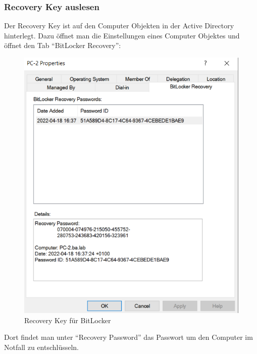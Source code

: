 \subsubsection{Recovery Key auslesen}
Der Recovery Key ist auf den Computer Objekten in der Active Directory hinterlegt.
Dazu öffnet man die Einstellungen eines Computer Objektes und öffnet den Tab ``BitLocker Recovery'':
\begin{figure}[H]
    \centering
    \includegraphics[width=0.7\linewidth]{../img/Encryption/bitlocker-recovery.png}
    \caption{Recovery Key für BitLocker}
\end{figure}
Dort findet man unter ``Recovery Password'' das Passwort um den Computer im Notfall zu entschlüsseln.